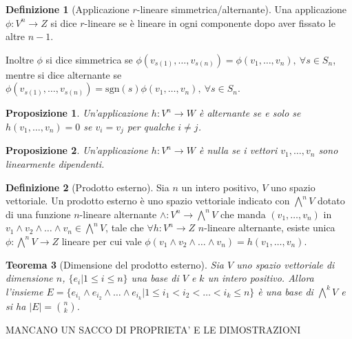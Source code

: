 \documentclass[11pt]{article}
\theoremstyle{plain}
\newtheorem{thm}{Teorema}[section]
\newtheorem{prop}[thm]{Proposizione}
\theoremstyle{definition}
\newtheorem{defn}{Definizione}[section]
\theoremstyle{remark}
\begin{document}
\begin{defn}[Applicazione $r$-lineare simmetrica/alternante]
 Una applicazione $\phi: V^n \to Z$ si dice $r$-lineare se è lineare in ogni componente dopo aver fissato le altre $n-1$.

 Inoltre $\phi$ si dice simmetrica se $\phi(v_{s(1)},\ldots,v_{s(n)})=\phi(v_1,\ldots,v_n),\ \forall s \in S_n$, mentre si dice 
 alternante se $\phi(v_{s(1)},\ldots,v_{s(n)})=\mathrm{sgn}(s)\phi(v_1,\ldots,v_n),\ \forall s \in S_n$.
 
\end{defn}

\begin{prop}
 Un'applicazione $h: V^n \to W$ è alternante se e solo se $h(v_1,\ldots,v_n)=0$ se $v_i=v_j$ per qualche $i\neq j$.
 \end{prop}

 \begin{prop}
  Un'applicazione $h: V^n \to W$ è nulla se i vettori $v_1,\ldots,v_n$ sono linearmente dipendenti.
 \end{prop}

\begin{defn}[Prodotto esterno]
Sia $n$ un intero positivo, $V$ uno spazio vettoriale. Un prodotto esterno è uno spazio vettoriale indicato con $\bigwedge^n V$
dotato di una funzione $n$-lineare alternante $\wedge: V^n \to \bigwedge^n V$ che manda $(v_1,\ldots,v_n)$ in 
$v_1\wedge v_2\wedge\ldots\wedge v_n \in \bigwedge^n V$, tale che $\forall h: V^n \to Z$ $n$-lineare alternante, 
esiste unica $\phi: \bigwedge^n V \to Z $ lineare per cui vale $\phi(v_1\wedge v_2\wedge \ldots \wedge v_n)=h(v_1,\ldots,v_n)$.

\label{defn:prodotto esterno}
\end{defn}





\begin{thm}[Dimensione del prodotto esterno]
Sia $V$ uno spazio vettoriale di dimensione $n$, $\{e_i| 1 \leq i \leq n\}$ una base di $V$ e $k$ un intero positivo.
Allora l'insieme $E=\{e_{i_1} \wedge e_{i_2}\wedge \ldots \wedge e_{i_k}| 1 \leq i_1 < i_2 <\ldots< i_k \leq n\}$ è una base di $\bigwedge^k V$ 
e si ha $|E|= \binom {n}{k}$.

\label{thm:prodotto esterno}
\end{thm}


MANCANO UN SACCO DI PROPRIETA' E LE DIMOSTRAZIONI
\end{document}
